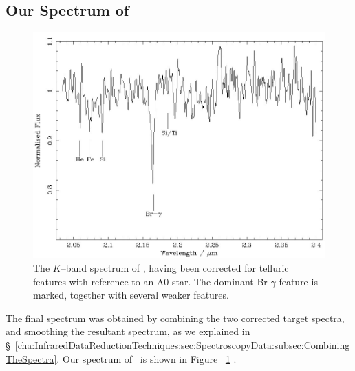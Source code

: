 
\subsection{Our Spectrum of \groj}
\label{cha:AccretionDiskContamination:sec:Spectroscopy:subsec:CombiningTheSpectra}

\begin{figure}[!htb]
\begin{center}
\includegraphics[width=5.0in]{j1655editedMasked}
\caption{%
The $K$--band spectrum of \groj, having been corrected for telluric
features with reference to an A0 star. The dominant Br-$\gamma$
feature is marked, together with several weaker features. }
\label{cha:AccretionDiskContamination:sec:Spectroscopy:subsec:CombiningTheSpectra:fig:j1655editedMasked}
\end{center}
\end{figure}

The final spectrum was obtained by combining the two corrected target spectra, and smoothing the resultant spectrum, as we explained in \S~\ref{cha:InfraredDataReductionTechniques:sec:SpectroscopyData:subsec:CombiningTheSpectra}. Our spectrum of \groj\ is shown in Figure~%
\ref{cha:AccretionDiskContamination:sec:Spectroscopy:subsec:CombiningTheSpectra:fig:j1655editedMasked}%
. %


